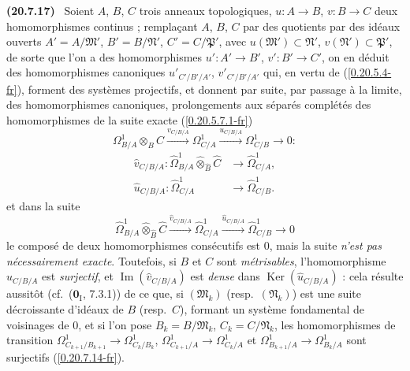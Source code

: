 \documentclass[10pt,oneside]{book}
\makeatletter
\newcommand{\sref}[1]{(\ref{#1})}
\newcommand{\setmanualcurrentlabel}[1]{\def\@currentlabel{#1}}
\newenvironment{env}[1][]{\setmanualcurrentlabel{#1}\par\medskip\noindent\textbf{(#1)}\ }{\par}
\makeatother
\begin{document}
\begin{env}[20.7.17]
\label{0.20.7.17-fr}
Soient $A$, $B$, $C$ trois anneaux topologiques, $u:A\to B$, $v:B\to C$ deux
homomorphismes continus ; remplaçant $A$, $B$, $C$ par des quotients par des
idéaux ouverts $A'=A/\mathfrak{M}'$, $B'=B/\mathfrak{N}'$,
$C'=C/\mathfrak{P}'$, avec $u(\mathfrak{M}')\subset\mathfrak{N}'$,
$v(\mathfrak{N}')\subset\mathfrak{P}'$, de sorte que l'on a des
homomorphismes $u':A'\to B'$, $v':B'\to C'$, on en déduit des homomorphismes
canoniques $u'_{C'/B'/A'}$, $v'_{C'/B'/A'}$ qui, en vertu de
\sref{0.20.5.4-fr}, forment des systèmes projectifs, et donnent par suite,
par passage à la limite, des homomorphismes canoniques, prolongements aux
séparés complétés des homomorphismes de la suite exacte
\sref{0.20.5.7.1-fr}
\[
  \Omega^1_{B/A}\otimes_B C\xrightarrow{v_{C/B/A}}\Omega^1_{C/A}
  \xrightarrow{u_{C/B/A}}\Omega^1_{C/B}\to0:
\]
\begin{align}
  \widehat v_{C/B/A}:\widehat{\Omega}^1_{B/A}
  \widehat\otimes_{\widehat B}\widehat C&\to\widehat{\Omega}^1_{C/A},
  \tag{20.7.17.1}\label{0.20.7.17.1-fr}\\
  \widehat u_{C/B/A}:\widehat{\Omega}^1_{C/A}&\to
  \widehat{\Omega}^1_{C/B}. \tag{20.7.17.2}\label{0.20.7.17.2-fr}
\end{align}
et dans la suite
\begin{equation}
\tag{20.7.17.3}
\label{0.20.7.17.3-fr}
  \widehat{\Omega}^1_{B/A}\widehat\otimes_{\widehat B}\widehat C
  \xrightarrow{\widehat v_{C/B/A}}\widehat{\Omega}^1_{C/A}
  \xrightarrow{\widehat u_{C/B/A}}\widehat{\Omega}^1_{C/B}\to0
\end{equation}
le composé de deux homomorphismes consécutifs est $0$, mais la suite
\emph{n'est pas nécessairement exacte}. Toutefois, si $B$ et $C$ sont
\emph{métrisables}, l'homomorphisme $\widehat u_{C/B/A}$ est \emph{surjectif},
et $\operatorname{Im}(\widehat v_{C/B/A})$ est \emph{dense} dans
$\operatorname{Ker}(\widehat u_{C/B/A})$ : cela résulte aussitôt
(cf.\ ($\mathbf{0}_{\mathrm I}$, 7.3.1)) de ce que, si
$(\mathfrak{M}_k)$ (resp.\ $(\mathfrak{N}_k)$) est une suite décroissante
d'idéaux de $B$ (resp.\ $C$), formant un système fondamental de voisinages de
$0$, et si l'on pose $B_k=B/\mathfrak{M}_k$, $C_k=C/\mathfrak{N}_k$, les
homomorphismes de transition
$\Omega^1_{C_{k+1}/B_{k+1}}\to\Omega^1_{C_k/B_k}$,
$\Omega^1_{C_{k+1}/A}\to\Omega^1_{C_k/A}$ et
$\Omega^1_{B_{k+1}/A}\to\Omega^1_{B_k/A}$ sont surjectifs
\sref{0.20.7.14-fr}.
\end{env}
\end{document}
